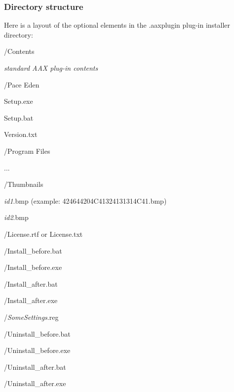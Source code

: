 \hypertarget{a00849_subsection__aax_venue_guide__installer__format}{}\subsubsection{Directory structure}\label{a00849_subsection__aax_venue_guide__installer__format}
 Here is a layout of the optional elements in the .aaxplugin plug-\/in installer directory\+: 
\begin{DoxyItemize}
\item /\+Contents 
\begin{DoxyItemize}
\item {\itshape standard A\+AX plug-\/in contents} 
\end{DoxyItemize}
\item /\+Pace Eden 
\begin{DoxyItemize}
\item Setup.\+exe  
\item Setup.\+bat  
\item Version.\+txt  
\end{DoxyItemize}
\item /\+Program Files 
\begin{DoxyItemize}
\item ...  
\end{DoxyItemize}
\item /\+Thumbnails 
\begin{DoxyItemize}
\item {\itshape id1}.bmp (example\+: 424644204\+C41324131314\+C41.\+bmp)  
\item {\itshape id2}.bmp  
\end{DoxyItemize}
\item /\+License.rtf or License.\+txt  
\item /\+Install\+\_\+before.bat  
\item /\+Install\+\_\+before.exe  
\item /\+Install\+\_\+after.bat  
\item /\+Install\+\_\+after.exe  
\item /{\itshape Some\+Settings}.reg  
\item /\+Uninstall\+\_\+before.bat  
\item /\+Uninstall\+\_\+before.exe  
\item /\+Uninstall\+\_\+after.bat  
\item /\+Uninstall\+\_\+after.exe  
\end{DoxyItemize}

